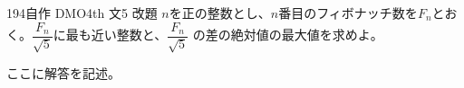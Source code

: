 \begin{prob}{194}{}{自作 DMO4th 文5 改題}
 $n$を正の整数とし、$n$番目のフィボナッチ数を$F_n$とおく。$\dfrac{F_n}{\sqrt{5}}$に最も近い整数と、$\dfrac{F_n}{\sqrt{5}}$ の差の絶対値の最大値を求めよ。
\end{prob}

ここに解答を記述。